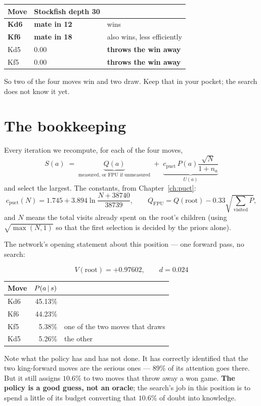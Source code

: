 \begin{center}
\begin{tabular}{@{}llp{7.3cm}@{}}
\toprule
Move & Stockfish depth 30 & \\
\midrule
\textbf{Kd6} & \textbf{mate in 12} & wins \\
\textbf{Kf6} & \textbf{mate in 18} & also wins, less efficiently \\
Kd5 & $0.00$ & \textbf{throws the win away} \\
Kf5 & $0.00$ & \textbf{throws the win away} \\
\bottomrule
\end{tabular}
\end{center}

So two of the four moves win and two draw. Keep that in your pocket; the search does not know
it yet.

\section{The bookkeeping}

Every iteration we recompute, for each of the four moves,
\[
  S(a) \;=\; \underbrace{Q(a)}_{\text{measured, or FPU if unmeasured}}
  \;+\;\underbrace{c_{\text{puct}}\,P(a)\frac{\sqrt{N}}{1+n_a}}_{U(a)}
\]
and select the largest. The constants, from Chapter~\ref{ch:puct}:
\[
  c_{\text{puct}}(N) = 1.745 + 3.894\ln\!\frac{N + 38740}{38739},\qquad
  Q_{\text{FPU}} = Q(\text{root}) - 0.33\sqrt{\textstyle\sum_{\text{visited}} P},
\]
and $N$ means the total visits already spent on the root's children (using $\sqrt{\max(N,1)}$
so that the first selection is decided by the priors alone).

The network's opening statement about this position --- one forward pass, no search:

\begin{realdata}[title={Real engine output: the root evaluation and priors}]
\[
  V(\text{root}) = +0.97602, \qquad d = 0.024
\]
\begin{center}
\begin{tabular}{@{}lrl@{}}
\toprule
Move & $P(a\,|\, s)$ & \\
\midrule
Kd6 & 45.13\% & \\
Kf6 & 44.23\% & \\
Kf5 &  5.38\% & one of the two moves that draws \\
Kd5 &  5.26\% & the other \\
\bottomrule
\end{tabular}
\end{center}
Note what the policy has and has not done. It has correctly identified that the two
king-forward moves are the serious ones --- $89\%$ of its attention goes there. But it still
assigns $10.6\%$ to two moves that throw away a won game. \textbf{The policy is a good guess,
not an oracle}; the search's job in this position is to spend a little of its budget
converting that $10.6\%$ of doubt into knowledge.
\end{realdata}

